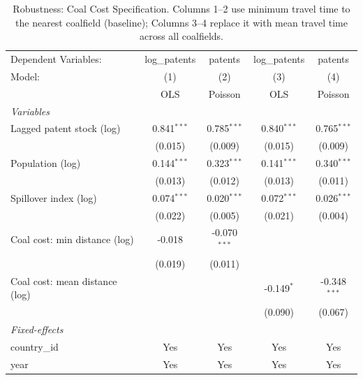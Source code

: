 
\begin{table}[htbp]
   \caption{\label{tab:rob_coal} Robustness: Coal Cost Specification. Columns 1--2 use minimum travel time to the nearest coalfield (baseline); Columns 3--4 replace it with mean travel time across all coalfields.}
   \centering
   \begin{tabular}{lcccc}
      \tabularnewline \midrule \midrule
      Dependent Variables:           & log\_patents  & patents        & log\_patents  & patents\\  
      Model:                         & (1)           & (2)            & (3)           & (4)\\  
                                     &  OLS          & Poisson        & OLS           & Poisson\\  
      \midrule
      \emph{Variables}\\
      Lagged patent stock (log)      & 0.841$^{***}$ & 0.785$^{***}$  & 0.840$^{***}$ & 0.765$^{***}$\\   
                                     & (0.015)       & (0.009)        & (0.015)       & (0.009)\\   
      Population (log)               & 0.144$^{***}$ & 0.323$^{***}$  & 0.141$^{***}$ & 0.340$^{***}$\\   
                                     & (0.013)       & (0.012)        & (0.013)       & (0.011)\\   
      Spillover index (log)          & 0.074$^{***}$ & 0.020$^{***}$  & 0.072$^{***}$ & 0.026$^{***}$\\   
                                     & (0.022)       & (0.005)        & (0.021)       & (0.004)\\   
      Coal cost: min distance (log)  & -0.018        & -0.070$^{***}$ &               &   \\   
                                     & (0.019)       & (0.011)        &               &   \\   
      Coal cost: mean distance (log) &               &                & -0.149$^{*}$  & -0.348$^{***}$\\   
                                     &               &                & (0.090)       & (0.067)\\   
      \midrule
      \emph{Fixed-effects}\\
      country\_id                    & Yes           & Yes            & Yes           & Yes\\  
      year                           & Yes           & Yes            & Yes           & Yes\\  

\end{tabular}
\end{table}
